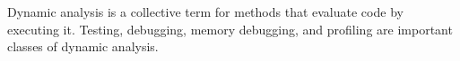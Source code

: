 Dynamic analysis is a collective term for methods that evaluate code by executing it.
Testing, debugging, memory debugging, and profiling are important classes of dynamic analysis.



